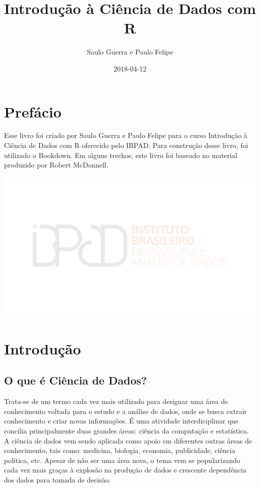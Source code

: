 \documentclass[]{book}
\title{Introdução à Ciência de Dados com R}
\author{Saulo Guerra e Paulo Felipe}
\date{2018-04-12}
\begin{document}
\maketitle

{
\setcounter{tocdepth}{1}
\tableofcontents
}
\chapter*{Prefácio}\label{prefacio}

Esse livro foi criado por Saulo Guerra e Paulo Felipe para o curso
Introdução à Ciência de Dados com R oferecido pelo IBPAD. Para
construção desse livro, foi utilizado o Bookdown. Em alguns trechos,
este livro foi baseado no material produzido por Robert McDonnell.

\begin{center}\includegraphics[width=1\linewidth]{./imagens/logo} \end{center}

\chapter{Introdução}\label{introducao}

\section{O que é Ciência de Dados?}\label{o-que-e-ciencia-de-dados}

Trata-se de um termo cada vez mais utilizado para designar uma área de
conhecimento voltada para o estudo e a análise de dados, onde se busca
extrair conhecimento e criar novas informações. É uma atividade
interdiciplinar que concilia principalmente duas grandes áreas: ciência
da computação e estatística. A ciência de dados vem sendo aplicada como
apoio em diferentes outras áreas de conhecimento, tais como: medicina,
biologia, economia, publicidade, ciência política, etc. Apesar de não
ser uma área nova, o tema vem se popularizando cada vez mais graças à
explosão na produção de dados e crescente dependência dos dados para
tomada de decisão.
\end{document}
